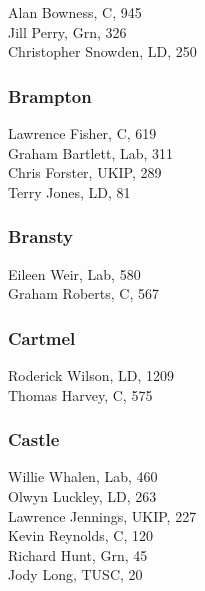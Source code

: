 \documentclass[a4paper,openany,10pt]{book}
\begin{document}


Alan Bowness, C, 945\\
Jill Perry, Grn, 326\\
Christopher Snowden, LD, 250\\


\subsubsection*{Brampton}



Lawrence Fisher, C, 619\\
Graham Bartlett, Lab, 311\\
Chris Forster, UKIP, 289\\
Terry Jones, LD, 81\\


\subsubsection*{Bransty}



Eileen Weir, Lab, 580\\
Graham Roberts, C, 567\\


\subsubsection*{Cartmel}



Roderick Wilson, LD, 1209\\
Thomas Harvey, C, 575\\


\subsubsection*{Castle}



Willie Whalen, Lab, 460\\
Olwyn Luckley, LD, 263\\
Lawrence Jennings, UKIP, 227\\
Kevin Reynolds, C, 120\\
Richard Hunt, Grn, 45\\
Jody Long, TUSC, 20\\
\end{document}
